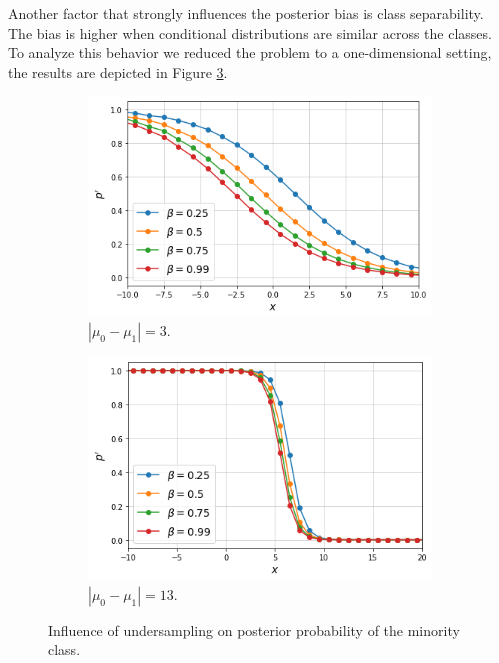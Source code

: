 \documentclass[conference]{IEEEtran}
\begin{document}
		Another factor that strongly influences the posterior bias is class separability. The bias is higher when conditional distributions are similar across the classes\cite{undersampling_posterior}. To analyze this behavior we reduced the problem to a one-dimensional setting, the results are depicted in Figure \ref{fig:Undersampling_posterior}.

			\begin{figure}[h]
			     \centering
			     \begin{subfigure}[h]{0.24\textwidth}
			         \centering
			         \includegraphics[width=\textwidth]{Undersampling_PosteriorBias}
			         \caption{$|\mu_0 - \mu_1|=3$.}
			         \label{fig:Undersampling_PosteriorBias}
			     \end{subfigure}
			     \hfill
			     \begin{subfigure}[h]{0.24\textwidth}
			         \centering
			         \includegraphics[width=\textwidth]{Undersampling_PosteriorBias_Separated}
			         \caption{$|\mu_0 - \mu_1|=13$.}
			         \label{fig:Undersampling_2D_UndersampledDataset}
			     \end{subfigure}
			        \caption{Influence of undersampling on posterior probability of the minority class.}
			        \label{fig:Undersampling_posterior}
			\end{figure}
		
\end{document}

